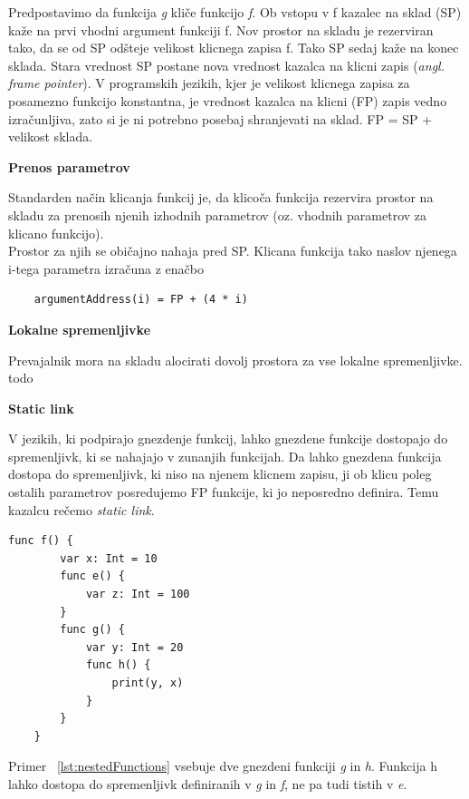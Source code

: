 \documentclass[a4paper, 12pt]{book}
\begin{document}
Predpostavimo da funkcija \textit{g} kliče funkcijo \textit{f}. Ob vstopu v f kazalec na sklad (SP) kaže na prvi vhodni argument funkciji f. Nov prostor na skladu je rezerviran tako, da se od SP odšteje velikost klicnega zapisa f. Tako SP sedaj kaže na konec sklada. Stara vrednost SP postane nova vrednost kazalca na klicni zapis (\textit{angl. frame pointer}). V programskih jezikih, kjer je velikost klicnega zapisa za posamezno funkcijo konstantna, je vrednost kazalca na klicni (FP) zapis vedno izračunljiva, zato si je ni potrebno posebaj shranjevati na sklad. FP = SP + velikost sklada. \cite{modernCompiler}

\textbf{Prenos parametrov}

Standarden način klicanja funkcij je, da klicoča funkcija rezervira prostor na skladu za prenosih njenih izhodnih parametrov (oz. vhodnih parametrov za klicano funkcijo). \cite{modernCompiler} \\
\indent Prostor za njih se običajno nahaja pred SP. Klicana funkcija tako naslov njenega i-tega parametra izračuna z enačbo 
\begin{lstlisting}
	argumentAddress(i) = FP + (4 * i)
\end{lstlisting}

\textbf{Lokalne spremenljivke}

Prevajalnik mora na skladu alocirati dovolj prostora za vse lokalne spremenljivke. todo

\textbf{Static link}

V jezikih, ki podpirajo gnezdenje funkcij, lahko gnezdene funkcije dostopajo do spremenljivk, ki se nahajajo v zunanjih funkcijah. Da lahko gnezdena funkcija dostopa do spremenljivk, ki niso na njenem klicnem zapisu, ji ob klicu poleg ostalih parametrov posredujemo FP funkcije, ki jo neposredno definira. Temu kazalcu rečemo \textit{static link}. 

\begin{lstlisting}[caption={Primer gnezdenih funkcij}, captionpos=b, label={lst:nestedFunctions}]
    func f() {
        var x: Int = 10
        func e() {
            var z: Int = 100
        }
        func g() {
            var y: Int = 20
            func h() {
                print(y, x)
            }
        }
    }
\end{lstlisting}

Primer ~\ref{lst:nestedFunctions} vsebuje dve gnezdeni funkciji \textit{g} in \textit{h}. Funkcija h lahko dostopa do spremenljivk definiranih v \textit{g} in \textit{f}, ne pa tudi tistih v \textit{e}.
\end{document}
